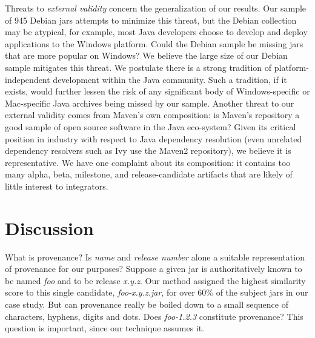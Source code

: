 Threats to {\em external validity} concern the generalization of our results.
Our sample of 945 Debian jars attempts to minimize this threat, but the
Debian collection may be atypical, for example, most Java developers choose
to develop and deploy applications to the Windows platform.  Could the
Debian sample be missing jars that are more popular on Windows?  We believe
the large size of our Debian sample mitigates this threat.  We postulate
there is a strong tradition of platform-independent development within the
Java community.  Such a tradition, if it exists, would further lessen the
risk of any significant body of Windows-specific or Mac-specific Java
archives being missed by our sample.  Another threat to our external
validity comes from Maven's own composition:  is Maven's repository a good
sample of open source software in the Java eco-system?  Given its critical
position in industry with respect to Java dependency resolution (even
unrelated dependency resolvers such as Ivy use the Maven2 repository), we
believe it is representative.  We have one complaint about its composition:
it contains too many alpha, beta, milestone, and release-candidate
artifacts that are likely of little interest to integrators.

\section{Discussion{\label{sec:discussion}}}


What is provenance?   Is \emph{name} and \emph{release number} alone a
suitable representation of provenance for our purposes?  Suppose a given
jar is authoritatively known to be named \emph{foo} and to be release
\emph{x.y.z}.  Our method assigned the highest similarity score to this
single candidate, \emph{foo-x.y.z.jar}, for over $60\%$ of the subject jars
in our case study.  But can provenance really be boiled down to a small
sequence of characters, hyphens, digits and dots.  Does \emph{foo-1.2.3}
constitute provenance?  This question is important, since our technique
assumes it.

